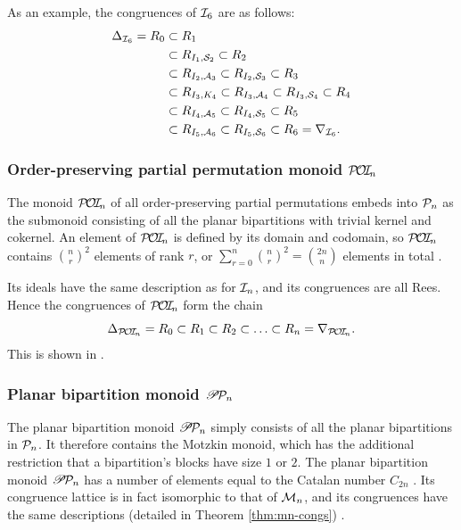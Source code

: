 As an example, the congruences of $\mathcal{I}_6$ are as follows:
\begin{align*}
  \Delta_{\mathcal{I}_6} = R_0 & \subset R_1 \\
      & \subset R_{I_1,\mathcal{S}_2} \subset R_2 \\
      & \subset R_{I_2,\mathcal{A}_3} \subset R_{I_2, \mathcal{S}_3} \subset R_3 \\
      & \subset R_{I_3,K_4} \subset R_{I_3,\mathcal{A}_4} \subset R_{I_3, \mathcal{S}_4} \subset R_4 \\
      & \subset R_{I_4,\mathcal{A}_5} \subset R_{I_4, \mathcal{S}_5} \subset R_5 \\
      & \subset R_{I_5,\mathcal{A}_6} \subset R_{I_5, \mathcal{S}_6} \subset R_6 = \nabla_{\mathcal{I}_6}.
\end{align*}

\subsubsection{Order-preserving partial permutation monoid $\mathcal{P\!O\!I\!}_n$}
The monoid $\mathcal{P\!O\!I\!}_n$ of all order-preserving partial permutations embeds into
$\mathcal{P}_n$ as the submonoid consisting of all the planar bipartitions with trivial
kernel and cokernel.  An element of $\mathcal{P\!O\!I\!}_n$ is defined by its domain and
codomain, so $\mathcal{P\!O\!I\!}_n$ contains $\binom{n}{r}^2$ elements of rank $r$, or
$\sum_{r=0}^n \binom{n}{r}^2 = \binom{2n}{n}$ elements in total
.

Its ideals have the same description as for $\mathcal{I}_n$, and
its congruences are all Rees.  Hence the congruences of $\mathcal{P\!O\!I\!}_n$ form the chain
$$\Delta_{\mathcal{P\!O\!I\!}_n} = R_0 \subset R_1 \subset R_2 \subset \ldots
\subset R_n = \nabla_{\mathcal{P\!O\!I\!}_n}.$$
This is shown in \cite[Proposition 2.6]{fernandes_2001}.

\subsubsection{Planar bipartition monoid $\mathscr{P}\!\mathcal{P}_n$}
The planar bipartition monoid $\mathscr{P}\!\mathcal{P}_n$ simply consists of all the planar
bipartitions in $\mathcal{P}_n$.  It therefore contains the Motzkin monoid, which has
the additional restriction that a bipartition's blocks have size $1$ or $2$.
The planar bipartition monoid $\mathscr{P}\!\mathcal{P}_n$ has a number of elements equal to the
Catalan number $C_{2n}$ .  Its congruence lattice is in fact
isomorphic to that of $\mathcal{M}_n$, and its congruences have the same
descriptions (detailed in Theorem \ref{thm:mn-congs}) \cite[\S7]{ourpaper}.


